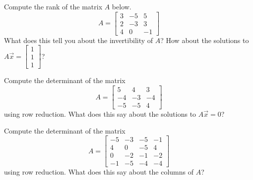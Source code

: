 \begin{exercise}\ansMark%
Compute the rank of the matrix $A$ below.
\[ A =  \begin{bmatrix} 3 & -5 & 5 \\ 2 &-3 & 3\\ 4 & 0 & -1 \end{bmatrix} \]
What does this tell you about the invertibility of $A$? How about the solutions to $A\vec{x} = \begin{bmatrix} 1\\1\\1 \end{bmatrix}$? 
\end{exercise}


\begin{exercise}\ansMark%
Compute the determinant of the matrix
\[ A = \begin{bmatrix}
5 & 4  & 3\\
-4 &-3 &-4\\
-5 &-5 & 4
\end{bmatrix}
\]
using row reduction. What does this say about the solutions to $A\vec{x} = 0$?
\end{exercise}

\begin{exercise}\ansMark%
Compute the determinant of the matrix
\[ A = \begin{bmatrix}
-5 & -3 & -5 & -1\\
4 & 0 &-5 &  4\\
0&-2 &-1 &-2\\
-1& -5 &-4 &-4
\end{bmatrix}
\]
using row reduction. What does this say about the columns of $A$?
\end{exercise}

